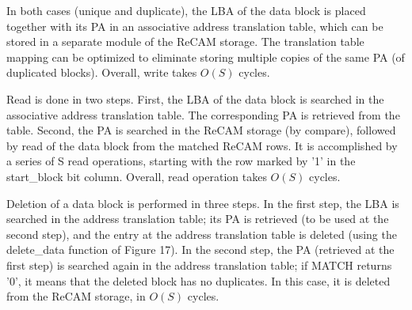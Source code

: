 \documentclass{superfri}
\begin{document}
In both cases (unique and duplicate), the LBA of the data block is placed together with its PA in an associative address translation table, which can be stored in a separate module of the ReCAM storage. The translation table mapping can be optimized to eliminate storing multiple copies of the same PA (of duplicated blocks). Overall, write takes $O(S)$ cycles.  

Read is done in two steps. First, the LBA of the data block is searched in the associative address translation table. The corresponding PA is retrieved from the table. Second, the PA is searched in the ReCAM storage (by compare), followed by read of the data block from the matched ReCAM rows. It is accomplished by a series of S read operations, starting with the row marked by '1' in the start\_block bit column. Overall, read operation takes $O(S)$ cycles.  
 
Deletion of a data block is performed in three steps. In the first step, the LBA is searched in the address translation table; its PA is retrieved (to be used at the second step), and the entry at the address translation table is deleted (using the delete\_data function of Figure 17). In the second step, the PA (retrieved at the first step) is searched again in the address translation table; if MATCH returns '0', it means that the deleted block has no duplicates. In this case, it is deleted from the ReCAM storage, in $O(S)$ cycles.  
\end{document}

